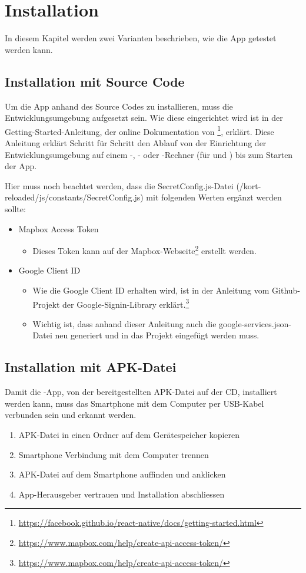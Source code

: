 \chapter{Installation}
\label{pd-installation}

In diesem Kapitel werden zwei Varianten beschrieben, wie die App getestet werden kann. 


\section{Installation mit Source Code}
Um die App anhand des Source Codes zu installieren, muss die  Entwicklungsumgebung aufgesetzt sein. 
Wie diese eingerichtet wird ist in der Getting-Started-Anleitung, der online Dokumentation von \footnote{\url{https://facebook.github.io/react-native/docs/getting-started.html}}, erklärt.
Diese Anleitung erklärt Schritt für Schritt den Ablauf von der Einrichtung der Entwicklungsumgebung auf einem -, - oder -Rechner (für  und ) bis zum Starten der App.

Hier muss noch beachtet werden, dass die SecretConfig.js-Datei (/kort-reloaded/js/constants/SecretConfig.js) mit folgenden Werten ergänzt werden sollte:

\begin{itemize}
	\item Mapbox Access Token
	\begin{itemize}
		\item Dieses Token kann auf der Mapbox-Webseite\footnote{\url{https://www.mapbox.com/help/create-api-access-token/}} erstellt werden.
	\end{itemize}
	
	\item Google Client ID 
	\begin{itemize}
		\item Wie die Google Client ID erhalten wird, ist in der Anleitung vom Github-Projekt der Google-Signin-Library erklärt.\footnote{\url{https://www.mapbox.com/help/create-api-access-token/}}
		\item Wichtig ist, dass anhand dieser Anleitung auch die google-services.json-Datei neu generiert und in das Projekt eingefügt werden muss.
	\end{itemize}
\end{itemize}

\section{Installation mit APK-Datei}
Damit die -App, von der bereitgestellten APK-Datei auf der CD, installiert werden kann, muss das Smartphone mit dem Computer per USB-Kabel verbunden sein und erkannt werden. 

\begin{enumerate}
	\item APK-Datei in einen Ordner auf dem Gerätespeicher kopieren
	\item Smartphone Verbindung mit dem Computer trennen
	\item APK-Datei auf dem Smartphone auffinden und anklicken
	\item App-Herausgeber vertrauen und Installation abschliessen
\end{enumerate}
